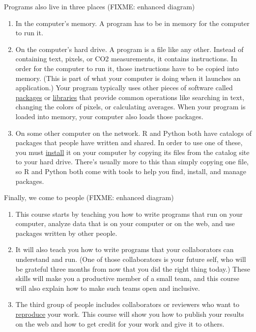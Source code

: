 \documentclass[]{Nemilov}
\begin{document}
Programs also live in three places (FIXME: enhanced diagram)

\begin{enumerate}
\def\labelenumi{\arabic{enumi}.}
\item
  In the computer's memory.
  A program has to be in memory for the computer to run it.
\item
  On the computer's hard drive.
  A program is a file like any other.
  Instead of containing text, pixels, or CO2 measurements,
  it contains instructions.
  In order for the computer to run it,
  those instructions have to be copied into memory.
  (This is part of what your computer is doing when it launches an application.)
  Your program typically uses other pieces of software
  called \href{glossary.html\#package}{packages} or \href{glossary.html\#library}{libraries}
  that provide common operations like searching in text,
  changing the colors of pixels,
  or calculating averages.
  When your program is loaded into memory,
  your computer also loads those packages.
\item
  On some other computer on the network.
  R and Python both have catalogs of packages that people have written and shared.
  In order to use one of these,
  you must \href{glossary.html\#install}{install} it on your computer
  by copying its files from the catalog site to your hard drive.
  There's usually more to this than simply copying one file,
  so R and Python both come with tools to help you find, install, and manage packages.
\end{enumerate}

Finally, we come to people (FIXME: enhanced diagram)

\begin{enumerate}
\def\labelenumi{\arabic{enumi}.}
\item
  This course starts by teaching you how to write programs that run on your computer,
  analyze data that is on your computer or on the web,
  and use packages written by other people.
\item
  It will also teach you how to write programs that your collaborators can understand and run.
  (One of those collaborators is your future self,
  who will be grateful three months from now that you did the right thing today.)
  These skills will make you a productive member of a small team,
  and this course will also explain how to make such teams open and inclusive.
\item
  The third group of people includes collaborators or reviewers
  who want to \href{glossary.html\#reproducible-research}{reproduce} your work.
  This course will show you how to publish your results on the web
  and how to get credit for your work and give it to others.
\end{enumerate}
\end{document}
